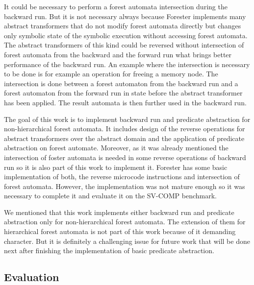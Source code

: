 \documentclass[fleqn,11pt]{ExcelAtFIT} %
\begin{document}
It could be necessary to perform a forest automata intersection during
the backward run.
But it is not necessary always because Forester implements many abstract transformers
that do not modify forest automata directly but changes only symbolic state of the symbolic execution
without accessing forest automata.
The abstract transformers of this kind could be reversed without intersection of forest automata
from the backward and the forward run what brings better performance of the backward run.
An example where the intersection is necessary to be done is for example an operation for freeing a memory node.
The intersection is done between a forest automaton from the backward run and a forest automaton from the forward
run in state before the abstract transformer has been applied.
The result automata is then further used in the backward run.

The goal of this work is to implement backward run and predicate abstraction
for non-hierarchical forest automata.
It includes design of the reverse operations for abstract transformers over
the abstract domain and the application of predicate abstraction on forest automate.
Moreover, as it was already mentioned the intersection of foster automata is needed in some reverse
operations of backward run so it is also part of this work to implement it.
Forester has some basic implementation of both, the reverse microcode instructions and
intersection of forest automata.
However, the implementation was not mature enough so it was necessary to
complete it and evaluate it on the SV-COMP benchmark.

We mentioned that this work implements either backward run and predicate abstraction only for
non-hierarchical forest automata.
The extension of them for hierarchical forest automata is not part
of this work because of it demanding character.
But it is definitely a challenging issue for future work
that will be done next after finishing the implementation of basic predicate abstraction.

\subsection{Evaluation}
\end{document}
